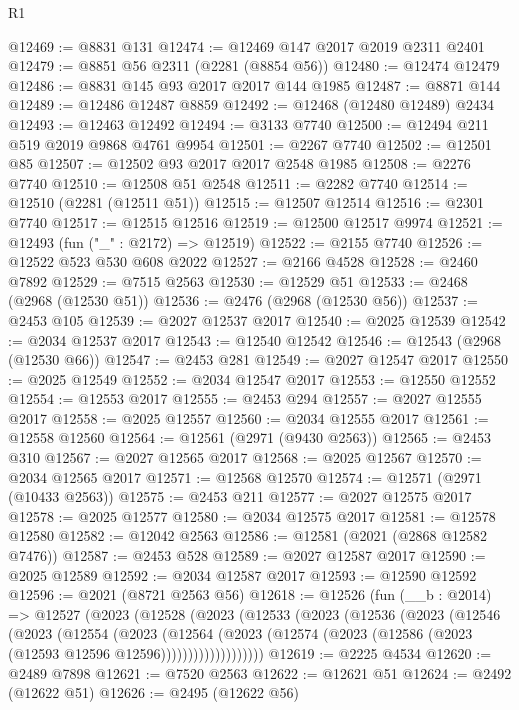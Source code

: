 \begin{lexlean}{R1}
\begin{coremodule}
@12469 := @8831 @131
@12474 := @12469 @147 @2017 @2019 @2311 @2401
@12479 := @8851 @56 @2311 (@2281 (@8854 @56))
@12480 := @12474 @12479
@12486 := @8831 @145 @93 @2017 @2017 @144 @1985
@12487 := @8871 @144
@12489 := @12486 @12487 @8859
@12492 := @12468 (@12480 @12489) @2434
@12493 := @12463 @12492
@12494 := @3133 @7740
@12500 := @12494 @211 @519 @2019 @9868 @4761 @9954
@12501 := @2267 @7740
@12502 := @12501 @85
@12507 := @12502 @93 @2017 @2017 @2548 @1985
@12508 := @2276 @7740
@12510 := @12508 @51 @2548
@12511 := @2282 @7740
@12514 := @12510 (@2281 (@12511 @51))
@12515 := @12507 @12514
@12516 := @2301 @7740
@12517 := @12515 @12516
@12519 := @12500 @12517 @9974
@12521 := @12493 (fun ("_" : @2172) => @12519)
@12522 := @2155 @7740
@12526 := @12522 @523 @530 @608 @2022
@12527 := @2166 @4528
@12528 := @2460 @7892
@12529 := @7515 @2563
@12530 := @12529 @51
@12533 := @2468 (@2968 (@12530 @51))
@12536 := @2476 (@2968 (@12530 @56))
@12537 := @2453 @105
@12539 := @2027 @12537 @2017
@12540 := @2025 @12539
@12542 := @2034 @12537 @2017
@12543 := @12540 @12542
@12546 := @12543 (@2968 (@12530 @66))
@12547 := @2453 @281
@12549 := @2027 @12547 @2017
@12550 := @2025 @12549
@12552 := @2034 @12547 @2017
@12553 := @12550 @12552
@12554 := @12553 @2017
@12555 := @2453 @294
@12557 := @2027 @12555 @2017
@12558 := @2025 @12557
@12560 := @2034 @12555 @2017
@12561 := @12558 @12560
@12564 := @12561 (@2971 (@9430 @2563))
@12565 := @2453 @310
@12567 := @2027 @12565 @2017
@12568 := @2025 @12567
@12570 := @2034 @12565 @2017
@12571 := @12568 @12570
@12574 := @12571 (@2971 (@10433 @2563))
@12575 := @2453 @211
@12577 := @2027 @12575 @2017
@12578 := @2025 @12577
@12580 := @2034 @12575 @2017
@12581 := @12578 @12580
@12582 := @12042 @2563
@12586 := @12581 (@2021 (@2868 @12582 @7476))
@12587 := @2453 @528
@12589 := @2027 @12587 @2017
@12590 := @2025 @12589
@12592 := @2034 @12587 @2017
@12593 := @12590 @12592
@12596 := @2021 (@8721 @2563 @56)
@12618 := @12526
    (fun (__b : @2014) =>
    @12527
      (@2023
        (@12528
          (@2023
            (@12533
              (@2023
                (@12536
                  (@2023
                    (@12546
                      (@2023
                        (@12554
                          (@2023
                            (@12564
                              (@2023
                                (@12574
                                  (@2023 (@12586 (@2023 (@12593 @12596 @12596)))))))))))))))))))
@12619 := @2225 @4534
@12620 := @2489 @7898
@12621 := @7520 @2563
@12622 := @12621 @51
@12624 := @2492 (@12622 @51)
@12626 := @2495 (@12622 @56)

\end{coremodule}
\end{lexlean}
